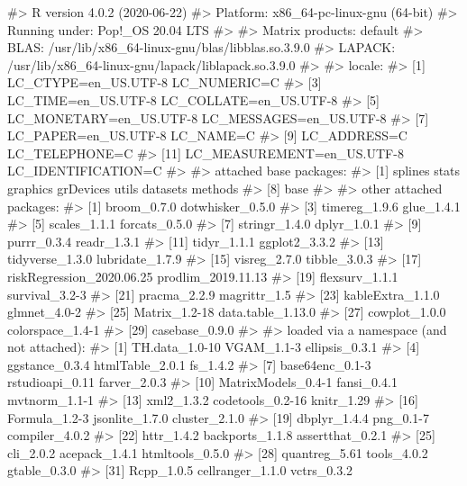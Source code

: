 \documentclass[
]{jss}
\begin{document}
\begin{CodeChunk}

\begin{CodeOutput}
#> R version 4.0.2 (2020-06-22)
#> Platform: x86_64-pc-linux-gnu (64-bit)
#> Running under: Pop!_OS 20.04 LTS
#> 
#> Matrix products: default
#> BLAS:   /usr/lib/x86_64-linux-gnu/blas/libblas.so.3.9.0
#> LAPACK: /usr/lib/x86_64-linux-gnu/lapack/liblapack.so.3.9.0
#> 
#> locale:
#>  [1] LC_CTYPE=en_US.UTF-8       LC_NUMERIC=C              
#>  [3] LC_TIME=en_US.UTF-8        LC_COLLATE=en_US.UTF-8    
#>  [5] LC_MONETARY=en_US.UTF-8    LC_MESSAGES=en_US.UTF-8   
#>  [7] LC_PAPER=en_US.UTF-8       LC_NAME=C                 
#>  [9] LC_ADDRESS=C               LC_TELEPHONE=C            
#> [11] LC_MEASUREMENT=en_US.UTF-8 LC_IDENTIFICATION=C       
#> 
#> attached base packages:
#> [1] splines   stats     graphics  grDevices utils     datasets  methods  
#> [8] base     
#> 
#> other attached packages:
#>  [1] broom_0.7.0               dotwhisker_0.5.0         
#>  [3] timereg_1.9.6             glue_1.4.1               
#>  [5] scales_1.1.1              forcats_0.5.0            
#>  [7] stringr_1.4.0             dplyr_1.0.1              
#>  [9] purrr_0.3.4               readr_1.3.1              
#> [11] tidyr_1.1.1               ggplot2_3.3.2            
#> [13] tidyverse_1.3.0           lubridate_1.7.9          
#> [15] visreg_2.7.0              tibble_3.0.3             
#> [17] riskRegression_2020.06.25 prodlim_2019.11.13       
#> [19] flexsurv_1.1.1            survival_3.2-3           
#> [21] pracma_2.2.9              magrittr_1.5             
#> [23] kableExtra_1.1.0          glmnet_4.0-2             
#> [25] Matrix_1.2-18             data.table_1.13.0        
#> [27] cowplot_1.0.0             colorspace_1.4-1         
#> [29] casebase_0.9.0           
#> 
#> loaded via a namespace (and not attached):
#>  [1] TH.data_1.0-10      VGAM_1.1-3          ellipsis_0.3.1     
#>  [4] ggstance_0.3.4      htmlTable_2.0.1     fs_1.4.2           
#>  [7] base64enc_0.1-3     rstudioapi_0.11     farver_2.0.3       
#> [10] MatrixModels_0.4-1  fansi_0.4.1         mvtnorm_1.1-1      
#> [13] xml2_1.3.2          codetools_0.2-16    knitr_1.29         
#> [16] Formula_1.2-3       jsonlite_1.7.0      cluster_2.1.0      
#> [19] dbplyr_1.4.4        png_0.1-7           compiler_4.0.2     
#> [22] httr_1.4.2          backports_1.1.8     assertthat_0.2.1   
#> [25] cli_2.0.2           acepack_1.4.1       htmltools_0.5.0    
#> [28] quantreg_5.61       tools_4.0.2         gtable_0.3.0       
#> [31] Rcpp_1.0.5          cellranger_1.1.0    vctrs_0.3.2        

\end{CodeOutput}
\end{CodeChunk}
\end{document}
